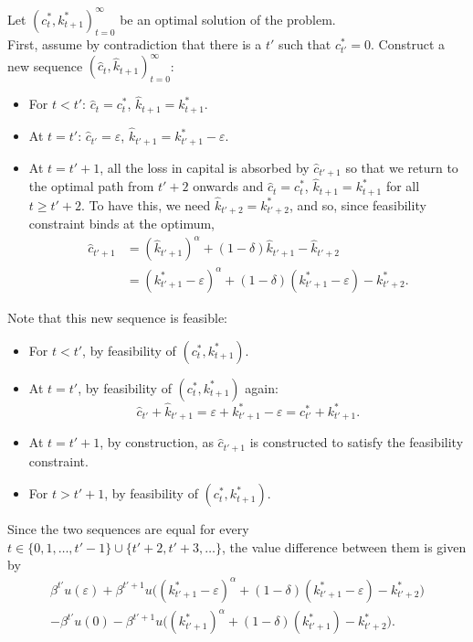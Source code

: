     Let $(c_t^*,k_{t+1}^*)_{t=0}^{\infty}$ be an optimal solution of the problem. \\
    First, assume by contradiction that there is a $t'$ such that $c_{t'}^*=0$.
    Construct a new sequence $(\hat c_t, \hat k_{t+1})_{t=0}^\infty$:
    \begin{itemize}
        \item For $t<t'$: $\hat c_t=c_t^*$, $\hat k_{t+1}=k_{t+1}^*$.
        \item At $t=t'$: $\hat c_{t'}=\varepsilon$, $\hat k_{t'+1}=k_{t'+1}^* -\varepsilon$.
        \item At $t = t' + 1$, all the loss in capital is absorbed by $\hat{c}_{t'+1}$ so that we return to the optimal path from $t' + 2$ onwards and $\hat c_t=c_t^*$, $\hat k_{t+1}=k_{t+1}^*$ for all $t \geq t' + 2$. 
        To have this, we need $\hat k_{t' + 2} = k_{t' + 2}^*$, and so, since feasibility constraint binds at the optimum,
        \begin{align*}
            \hat c_{t'+ 1} &= (\hat k_{t' + 1})^\alpha + (1 - \delta) \hat k_{t' + 1} - \hat k_{t' + 2} \\
            & = (k_{t'+1}^* -\varepsilon)^\alpha + (1- \delta)(k_{t'+1}^* -\varepsilon) - k_{t' + 2}^*.
        \end{align*}
    \end{itemize}
Note that this new sequence is feasible:
\begin{itemize}
    \item For $t<t'$, by feasibility of $(c_t^*,k_{t+1}^*)$.
    \item At $t=t'$, by feasibility of $(c_t^*,k_{t+1}^*)$ again:
    \[
    \hat c_{t'}+\hat k_{t'+1}=\varepsilon + k_{t' + 1}^*-\varepsilon = c^*_{t'}+ k^*_{t'+1}.
    \]
    \item At $t=t'+1$, by construction, as $\hat c_{t' + 1}$ is constructed to satisfy the feasibility constraint. 
    \item For $t> t' + 1$, by feasibility of $(c_t^*,k_{t+1}^*)$.

\end{itemize}
Since the two sequences are equal for every $t \in \{0,1,\dots, t'-1\} \cup \{t' + 2,t'+3,\dots\}$, the value difference between them is given by
\begin{align*}
\beta ^{t'} u(\varepsilon) + \beta^{t' + 1}u \big((k_{t'+1}^* -\varepsilon)^\alpha + (1- \delta)(k_{t'+1}^* -\varepsilon) - k_{t' + 2}^*\big) \\ - \beta ^{t'} u(0) - \beta^{t' + 1}u \big((k_{t'+1}^*)^\alpha + (1- \delta)(k_{t'+1}^*) - k_{t' + 2}^*\big).
\end{align*}
